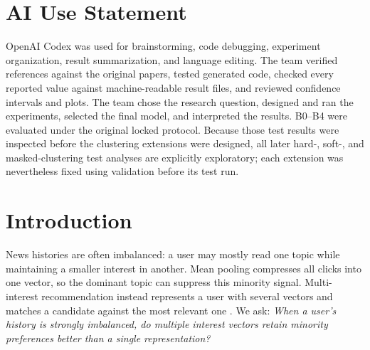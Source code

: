 \begin{abstract}
A single user vector can be dominated by frequently read topics and may under-represent smaller but persistent interests. We study whether multiple user-interest vectors improve minority-interest retrieval on MINDsmall while preserving overall ranking quality. Under a shared frozen sentence encoder and identical candidate scoring, conventional learned multi-head attention does not discover distinct interests: its heads collapse to almost identical vectors and its minority Recall@10 is statistically indistinguishable from single attention. We then replace unconstrained heads with semantic spherical $K$-means assignments over a user's history. Hard clustering improves minority Recall@10 by 0.0146 over mean pooling and by 0.0091 over random grouping while maintaining NDCG@10. A differentiable soft-clustering extension raises minority recall further but introduces a small ranking-quality trade-off; an auxiliary masked-history objective gives no reliable additional gain. Controlled 80:20 and 90:10 histories confirm that semantic separation, rather than temperature alone or extra parameters, exposes minority preferences.
\end{abstract}

\section{AI Use Statement}
OpenAI Codex was used for brainstorming, code debugging, experiment organization, result summarization, and language editing. The team verified references against the original papers, tested generated code, checked every reported value against machine-readable result files, and reviewed confidence intervals and plots. The team chose the research question, designed and ran the experiments, selected the final model, and interpreted the results. B0--B4 were evaluated under the original locked protocol. Because those test results were inspected before the clustering extensions were designed, all later hard-, soft-, and masked-clustering test analyses are explicitly exploratory; each extension was nevertheless fixed using validation before its test run.

\section{Introduction}
News histories are often imbalanced: a user may mostly read one topic while maintaining a smaller interest in another. Mean pooling compresses all clicks into one vector, so the dominant topic can suppress this minority signal. Multi-interest recommendation instead represents a user with several vectors and matches a candidate against the most relevant one \cite{cen2020comirec}. We ask: \emph{When a user's history is strongly imbalanced, do multiple interest vectors retain minority preferences better than a single representation?}

